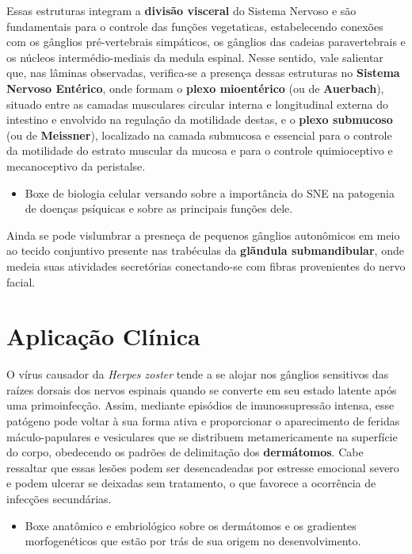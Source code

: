\documentclass[
]{book}
\providecommand{\tightlist}{%
  \setlength{\itemsep}{0pt}\setlength{\parskip}{0pt}}
\theoremstyle{definition}
\theoremstyle{definition}
\theoremstyle{definition}
\theoremstyle{definition}
\theoremstyle{remark}
\begin{document}
Essas estruturas integram a \textbf{divisão visceral} do Sistema Nervoso e são fundamentais para o controle das funções vegetaticas, estabelecendo conexões com os gânglios pré-vertebrais simpáticos, os gânglios das cadeias paravertebrais e os núcleos intermédio-mediais da medula espinal. Nesse sentido, vale salientar que, nas lâminas observadas, verifica-se a presença dessas estruturas no \textbf{Sistema Nervoso Entérico}, onde formam o \textbf{plexo mioentérico} (ou de \textbf{Auerbach}), situado entre as camadas musculares circular interna e longitudinal externa do intestino e envolvido na regulação da motilidade destas, e o \textbf{plexo submucoso} (ou de \textbf{Meissner}), localizado na camada submucosa e essencial para o controle da motilidade do estrato muscular da mucosa e para o controle quimioceptivo e mecanoceptivo da peristalse.

\begin{itemize}
\tightlist
\item
  Boxe de biologia celular versando sobre a importância do SNE na patogenia de doenças psíquicas e sobre as principais funções dele.
\end{itemize}

Ainda se pode vislumbrar a presneça de pequenos gânglios autonômicos em meio ao tecido conjuntivo presente nas trabéculas da \textbf{glãndula submandibular}, onde medeia suas atividades secretórias conectando-se com fibras provenientes do nervo facial.

\hypertarget{aplicauxe7uxe3o-cluxednica}{%
\section{Aplicação Clínica}\label{aplicauxe7uxe3o-cluxednica}}

O vírus causador da \emph{Herpes zoster} tende a se alojar nos gânglios sensitivos das raízes dorsais dos nervos espinais quando se converte em seu estado latente após uma primoinfecção. Assim, mediante episódios de imunossupressão intensa, esse patógeno pode voltar à sua forma ativa e proporcionar o aparecimento de feridas máculo-papulares e vesiculares que se distribuem metamericamente na superfície do corpo, obedecendo os padrões de delimitação dos \textbf{dermátomos}. Cabe ressaltar que essas lesões podem ser desencadeadas por estresse emocional severo e podem ulcerar se deixadas sem tratamento, o que favorece a ocorrência de infecções secundárias.

\begin{itemize}
\tightlist
\item
  Boxe anatômico e embriológico sobre os dermátomos e os gradientes morfogenéticos que estão por trás de sua origem no desenvolvimento.
\end{itemize}
\end{document}
